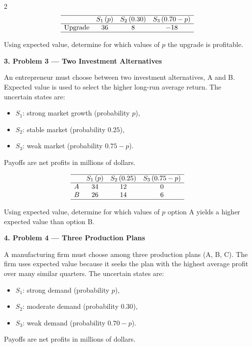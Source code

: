 \documentclass[12pt]{article}
\newcommand{\SubsectionBox}[1]{%
	\noindent\colorbox{gray!30}{%
		\parbox{\linewidth}{\textbf{#1}}%
	}\par\vspace{0.35cm}%
}
\begin{document}
\begin{multicols}{2}
				\[
				\begin{array}{lccc}
					\hline
					& S_1\,(p) & S_2\,(0.30) & S_3\,(0.70-p) \\
					\hline
					\mbox{Upgrade} & 36 & 8 & -18 \\
					\hline
				\end{array}
				\]
				
				Using expected value, determine for which values of \(p\) the upgrade is profitable.

		\vspace{0.25cm}
		\SubsectionBox{3. Problem 3 --- Two Investment Alternatives}\vspace{-0.25cm}
		An entrepreneur must choose between two investment alternatives, A and B. Expected value is used to select the higher long-run average return. The uncertain states are:
				\begin{itemize}
					\item \(S_1\): strong market growth (probability \(p\)),
					\item \(S_2\): stable market (probability \(0.25\)),
					\item \(S_3\): weak market (probability \(0.75-p\)).
				\end{itemize}
				Payoffs are net profits in millions of dollars.
				
				\[
				\begin{array}{lccc}
					\hline
					& S_1\,(p) & S_2\,(0.25) & S_3\,(0.75-p) \\
					\hline
					A & 34 & 12 & 0 \\
					B & 26 & 14 & 6 \\
					\hline
				\end{array}
				\]
				
				Using expected value, determine for which values of \(p\) option A yields a higher expected value than option B.

		\vspace{0.25cm}
		\SubsectionBox{4. Problem 4 --- Three Production Plans}\vspace{-0.25cm}
		A manufacturing firm must choose among three production plans (A, B, C). The firm uses expected value because it seeks the plan with the highest average profit over many similar quarters. The uncertain states are:
				\begin{itemize}
					\item \(S_1\): strong demand (probability \(p\)),
					\item \(S_2\): moderate demand (probability \(0.30\)),
					\item \(S_3\): weak demand (probability \(0.70-p\)).
				\end{itemize}
				Payoffs are net profits in millions of dollars.
				

\end{multicols}
\end{document}
